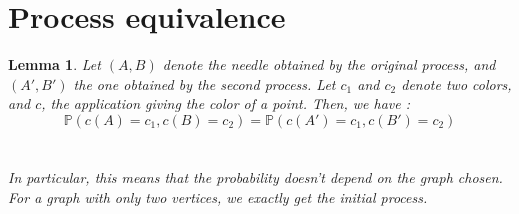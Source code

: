 \documentclass[a4paper,11pt]{article}
\newtheorem{lemma}{Lemma}
\theoremstyle{definition}
\theoremstyle{remark}
\begin{document}
\section{Process equivalence}
\label{equiv}
\begin{lemma}\label{huitre}
Let $(A,B)$ denote the needle obtained by the original process, and
$(A',B')$ the one obtained by the second process. Let $c_1$ and $c_2$ denote two colors, and $c$, the application giving the color of a point. Then, we have :\\
 $$\mathbb{P}(c(A) = c_1 , c(B) = c_2) = \mathbb{P}(c(A') = c_1, c(B') = c_2) $$ \\
 \\
 In particular, this means that the probability doesn't depend on the graph chosen. For a graph with only two vertices, we exactly get the initial process.
\end{lemma}
\end{document}
